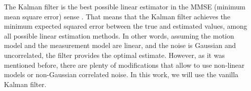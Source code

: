 The Kalman filter is the best possible linear estimator in the MMSE (minimum mean square error) sense \cite{humpherysFreshLookKalman2012}. That means that the Kalman filter achieves the minimum expected squared error between the true and estimated values, among all possible linear estimation methods. In other words, assuming the motion model and the measurement model are linear, and the noise is Gaussian and uncorrelated, the filter provides the optimal estimate. However, as it was mentioned before, there are plenty of modifications that allow to use non-linear models or non-Gaussian correlated noise. In this work, we will use the vanilla Kalman filter.
